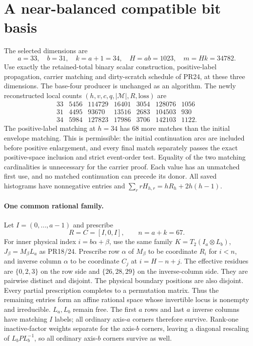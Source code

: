 \section{A near-balanced compatible bit basis}
The selected dimensions are
\[
 a=33,\quad b=31,\quad k=a+1=34,\quad H=ab=1023,\quad m=Hk=34782.
\]
Use exactly the retained-total binary scalar construction, positive-label
propagation, carrier matching and dirty-scratch schedule of PR24, at these
three dimensions. The base-four producer is unchanged as an algorithm.
The newly reconstructed local counts $(h,v,c,q,|\mathcal M|,R,\mathrm{loss})$ are
\[
\begin{array}{c|rrrrrr}
33&5456&114729&16401&3054&128076&1056\\
31&4495&93670&13516&2683&104503&930\\
34&5984&127823&17986&3706&142103&1122.
\end{array}
\]
The positive-label matching at $h=34$ has 68 more matches than the initial
envelope matching. This is permissible: the initial continuation arcs are
included before positive enlargement, and every final match separately
passes the exact positive-space inclusion and strict event-order test.
Equality of the two matching cardinalities is unnecessary for the carrier
proof. Each value has an unmatched first use, and no matched continuation
can precede its donor. All saved histograms have nonnegative entries and
\(\sum_r rH_{h,r}=hR_h+2h(h-1)\).

\paragraph{One common rational family.}
Let $I=(0,\ldots,a-1)$ and prescribe
\[
 R=C=[I,0,I],\qquad n=a+k=67.
\]
For inner physical index $i=b\alpha+\beta$, use the same family
$K=T_2(I_a\otimes L_b)$, $J_\beta=M_\beta L_a$ as PR18/24.
Prescribe row $\alpha$ of $M_\beta$ to be coordinate $R_i$ for $i<n$,
and inverse column $\alpha$ to be coordinate $C_j$ at $i=H-n+j$.
The effective residues are $\{0,2,3\}$ on the row side and
$\{26,28,29\}$ on the inverse-column side. They are pairwise distinct
and disjoint. The physical boundary positions are also disjoint.
Every partial prescription completes to a permutation matrix. Thus the
remaining entries form an affine rational space whose invertible locus
is nonempty and irreducible. $L_a,L_b$ remain free.
The first $a$ rows and last $a$ inverse columns have matching $I$ labels;
all ordinary axis-$a$ corners therefore survive. Rank-one inactive-factor
weights separate for the axis-$b$ corners, leaving a diagonal rescaling of
$L_bPL_b^{-1}$, so all ordinary axis-$b$ corners survive as well.

